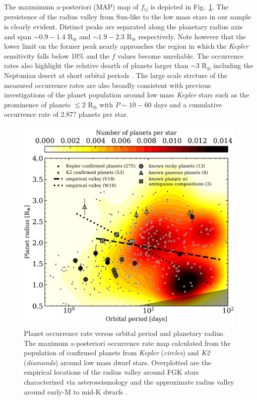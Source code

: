 \documentclass[twocolumn]{emulateapj}
\newcommand{\kepler}[1]{\emph{Kepler}#1}
\newcommand{\ktwo}[1]{\emph{K2}#1}
\begin{document}
The maxmimum a-posteriori (MAP) map of $f_{ij}$ is depicted in Fig.~\ref{fig:fmap}.
The persistence of the radius valley from Sun-like to the low mass stars in our sample is clearly
evident. Distinct peaks are separated along the planetary radius axis and span
$\sim 0.9-1.4$ R$_{\oplus}$ and $\sim 1.9-2.3$ R$_{\oplus}$ respectively.
Note however that the lower limit on the former peak nearly
approaches the region in which the \kepler{} sensitivity falls below 10\% and the $f$ values become
unreliable. %
The occurrence rates also highlight the relative dearth of planets larger than $\sim 3$ R$_{\oplus}$
including the Neptunian desert at short orbital periods \citep{lundkvist16,mazeh16}. The large scale
strcture of the measured occurrence rates are also broadly consistent with previous investigations
of the planet population around low mass \kepler{} stars \citep{dressing13,dressing15a,gaidos16} such
as the prominence of planets $\lesssim 2$ R$_{\oplus}$ with $P \sim 10-60$ days and a cumulative
occurrence rate of 2.87? planets per star.

\begin{figure}
  \centering
  \includegraphics[width=.7\hsize]{figures/fmap_Msgt0d0_xbin39_ybin26.png}
  \caption{Planet occurrence rate versus orbital period and planetary radius. The maximum a-posteriori occurrence
    rate map calculated from the population of confirmed planets from \kepler{} (\emph{circles}) and
    \ktwo{} (\emph{diamonds}) around low mass dwarf
    stars. Overplotted are the empirical locations of the radius valley around FGK stars 
    characterized via asteroseismology \citep[\emph{dashed line},][]{vaneylen18} and the approximate radius
    valley around early-M to mid-K dwarfs \citep[\emph{dotted line},][]{wu19}.}
  \label{fig:fmap}
\end{figure}
\end{document}
